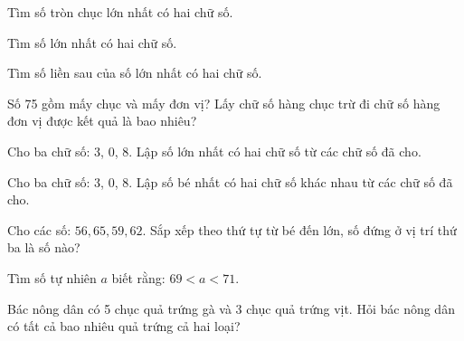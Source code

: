 \begin{ex}
Tìm số tròn chục lớn nhất có hai chữ số.
\end{ex}

\begin{ex}
Tìm số lớn nhất có hai chữ số.
\end{ex}

\begin{ex}
Tìm số liền sau của số lớn nhất có hai chữ số.
\end{ex}

\begin{ex}
Số 75 gồm mấy chục và mấy đơn vị? Lấy chữ số hàng chục trừ đi chữ số hàng đơn vị được kết quả là bao nhiêu?
\end{ex}

\begin{ex}
Cho ba chữ số: 3, 0, 8. Lập số lớn nhất có hai chữ số từ các chữ số đã cho.
\end{ex}

\begin{ex}
Cho ba chữ số: 3, 0, 8. Lập số bé nhất có hai chữ số khác nhau từ các chữ số đã cho.
\end{ex}

\begin{ex}
Cho các số: $56, 65, 59, 62$. Sắp xếp theo thứ tự từ bé đến lớn, số đứng ở vị trí thứ ba là số nào?
\end{ex}

\begin{ex}
Tìm số tự nhiên $a$ biết rằng: $69 < a < 71$.
\end{ex}

\begin{ex}
Bác nông dân có 5 chục quả trứng gà và 3 chục quả trứng vịt. Hỏi bác nông dân có tất cả bao nhiêu quả trứng cả hai loại?
\end{ex}

